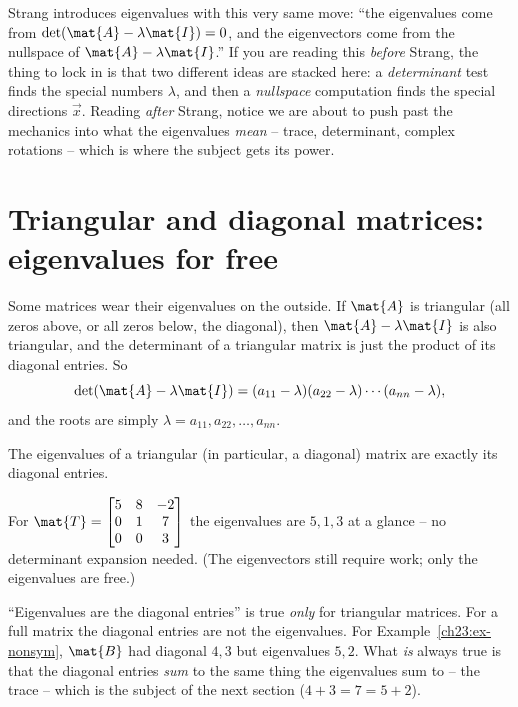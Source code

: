 \begin{strangbox}
Strang introduces eigenvalues with this very same move: ``the eigenvalues come
from $\det(\mat{A}-\lambda\mat{I})=0$, and the eigenvectors come from the
nullspace of $\mat{A}-\lambda\mat{I}$.'' If you are reading this \emph{before}
Strang, the thing to lock in is that two different ideas are stacked here: a
\emph{determinant} test finds the special numbers $\lambda$, and then a
\emph{nullspace} computation finds the special directions $\vec{x}$. Reading
\emph{after} Strang, notice we are about to push past the mechanics into what the
eigenvalues \emph{mean} -- trace, determinant, complex rotations -- which is where
the subject gets its power.
\end{strangbox}

\section{Triangular and diagonal matrices: eigenvalues for free}
\label{ch23:triangular}

Some matrices wear their eigenvalues on the outside. If $\mat{A}$ is triangular
(all zeros above, or all zeros below, the diagonal), then $\mat{A}-\lambda\mat{I}$
is also triangular, and the determinant of a triangular matrix is just the product
of its diagonal entries. So
\[
  \det(\mat{A}-\lambda\mat{I})=(a_{11}-\lambda)(a_{22}-\lambda)\cdots(a_{nn}-\lambda),
\]
and the roots are simply $\lambda=a_{11},a_{22},\dots,a_{nn}$.

\begin{proposition}
\label{ch23:prop-triangular}
The eigenvalues of a triangular (in particular, a diagonal) matrix are exactly its
diagonal entries.
\end{proposition}

\begin{example}
\label{ch23:ex-tri}
For $\mat{T}=\begin{bmatrix}5 & 8 & -2\\ 0 & 1 & 7\\ 0 & 0 & 3\end{bmatrix}$ the
eigenvalues are $5,1,3$ at a glance -- no determinant expansion needed. (The
eigenvectors still require work; only the eigenvalues are free.)
\end{example}

\begin{trapbox}
``Eigenvalues are the diagonal entries'' is true \emph{only} for triangular
matrices. For a full matrix the diagonal entries are not the eigenvalues. For
Example~\ref{ch23:ex-nonsym}, $\mat{B}$ had diagonal $4,3$ but eigenvalues $5,2$.
What \emph{is} always true is that the diagonal entries \emph{sum} to the same
thing the eigenvalues sum to -- the trace -- which is the subject of the next
section ($4+3=7=5+2$).
\end{trapbox}

